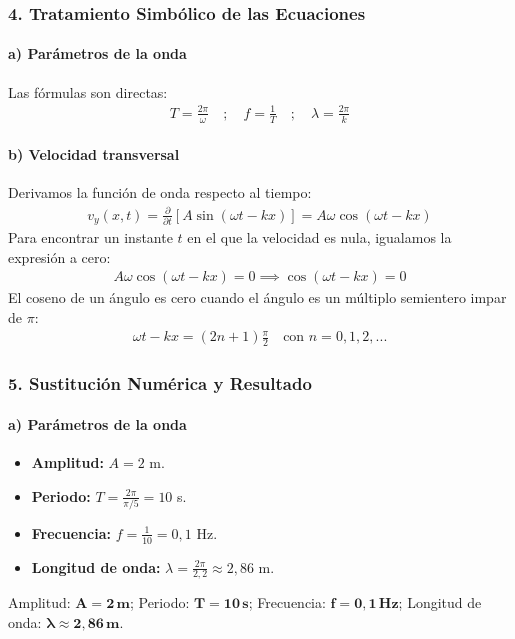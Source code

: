 \subsubsection*{4. Tratamiento Simbólico de las Ecuaciones}
\paragraph{a) Parámetros de la onda}
Las fórmulas son directas:
\begin{gather}
    T = \frac{2\pi}{\omega} \quad ; \quad f = \frac{1}{T} \quad ; \quad \lambda = \frac{2\pi}{k}
\end{gather}
\paragraph{b) Velocidad transversal}
Derivamos la función de onda respecto al tiempo:
\begin{gather}
    v_y(x,t) = \frac{\partial}{\partial t} [A \sin(\omega t - kx)] = A\omega \cos(\omega t - kx)
\end{gather}
Para encontrar un instante $t$ en el que la velocidad es nula, igualamos la expresión a cero:
\begin{gather}
    A\omega \cos(\omega t - kx) = 0 \implies \cos(\omega t - kx) = 0
\end{gather}
El coseno de un ángulo es cero cuando el ángulo es un múltiplo semientero impar de $\pi$:
\begin{gather}
    \omega t - kx = (2n+1)\frac{\pi}{2} \quad \text{con } n = 0, 1, 2, ...
\end{gather}

\subsubsection*{5. Sustitución Numérica y Resultado}
\paragraph{a) Parámetros de la onda}
\begin{itemize}
    \item \textbf{Amplitud:} $A = 2$ m.
    \item \textbf{Periodo:} $T = \frac{2\pi}{\pi/5} = 10$ s.
    \item \textbf{Frecuencia:} $f = \frac{1}{10} = 0,1$ Hz.
    \item \textbf{Longitud de onda:} $\lambda = \frac{2\pi}{2,2} \approx 2,86$ m.
\end{itemize}
\begin{cajaresultado}
Amplitud: $\boldsymbol{A=2\,\textbf{m}}$; Periodo: $\boldsymbol{T=10\,\textbf{s}}$; Frecuencia: $\boldsymbol{f=0,1\,\textbf{Hz}}$; Longitud de onda: $\boldsymbol{\lambda \approx 2,86\,\textbf{m}}$.
\end{cajaresultado}

